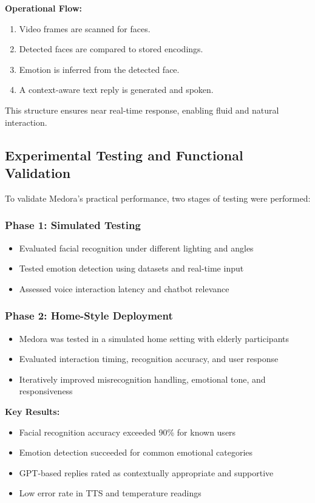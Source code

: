 \textbf{Operational Flow:}
\begin{enumerate}
    \item Video frames are scanned for faces.
    \item Detected faces are compared to stored encodings.
    \item Emotion is inferred from the detected face.
    \item A context-aware text reply is generated and spoken.
\end{enumerate}

This structure ensures near real-time response, enabling fluid and natural interaction.

\subsection{Experimental Testing and Functional Validation}

To validate Medora’s practical performance, two stages of testing were performed:

\subsubsection*{Phase 1: Simulated Testing}
\begin{itemize}
    \item Evaluated facial recognition under different lighting and angles
    \item Tested emotion detection using datasets and real-time input
    \item Assessed voice interaction latency and chatbot relevance
\end{itemize}

\subsubsection*{Phase 2: Home-Style Deployment}
\begin{itemize}
    \item Medora was tested in a simulated home setting with elderly participants
    \item Evaluated interaction timing, recognition accuracy, and user response
    \item Iteratively improved misrecognition handling, emotional tone, and responsiveness
\end{itemize}

\textbf{Key Results:}
\begin{itemize}
    \item Facial recognition accuracy exceeded 90\% for known users
    \item Emotion detection succeeded for common emotional categories
    \item GPT-based replies rated as contextually appropriate and supportive
    \item Low error rate in TTS and temperature readings
\end{itemize}

